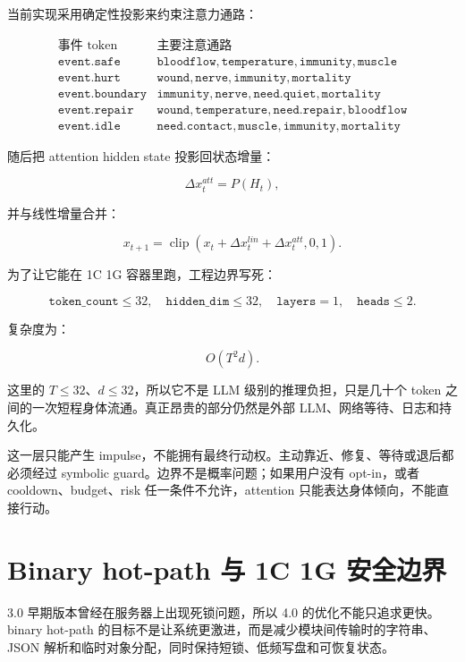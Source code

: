 \documentclass[UTF8,12pt]{ctexart}
\begin{document}
当前实现采用确定性投影来约束注意力通路：

\[
\begin{array}{c|l}
\text{事件 token} & \text{主要注意通路} \\
\hline
\texttt{event.safe} & \texttt{bloodflow},\texttt{temperature},\texttt{immunity},\texttt{muscle} \\
\texttt{event.hurt} & \texttt{wound},\texttt{nerve},\texttt{immunity},\texttt{mortality} \\
\texttt{event.boundary} & \texttt{immunity},\texttt{nerve},\texttt{need.quiet},\texttt{mortality} \\
\texttt{event.repair} & \texttt{wound},\texttt{temperature},\texttt{need.repair},\texttt{bloodflow} \\
\texttt{event.idle} & \texttt{need.contact},\texttt{muscle},\texttt{immunity},\texttt{mortality}
\end{array}
\]

随后把 attention hidden state 投影回状态增量：

\[
\Delta x_t^{att}=P(H_t),
\]

并与线性增量合并：

\[
x_{t+1}=\operatorname{clip}\left(x_t+\Delta x_t^{lin}+\Delta x_t^{att},0,1\right).
\]

为了让它能在 1C 1G 容器里跑，工程边界写死：

\[
\texttt{token\_count}\leq32,\quad \texttt{hidden\_dim}\leq32,\quad \texttt{layers}=1,\quad \texttt{heads}\leq2.
\]

复杂度为：

\[
O(T^2 d).
\]

这里的 $T\leq32$、$d\leq32$，所以它不是 LLM 级别的推理负担，只是几十个 token 之间的一次短程身体流通。真正昂贵的部分仍然是外部 LLM、网络等待、日志和持久化。

这一层只能产生 impulse，不能拥有最终行动权。主动靠近、修复、等待或退后都必须经过 symbolic guard。边界不是概率问题；如果用户没有 opt-in，或者 cooldown、budget、risk 任一条件不允许，attention 只能表达身体倾向，不能直接行动。

\section{Binary hot-path 与 1C 1G 安全边界}

3.0 早期版本曾经在服务器上出现死锁问题，所以 4.0 的优化不能只追求更快。binary hot-path 的目标不是让系统更激进，而是减少模块间传输时的字符串、JSON 解析和临时对象分配，同时保持短锁、低频写盘和可恢复状态。
\end{document}
